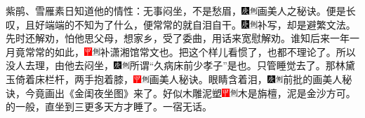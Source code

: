 紫鹃、雪雁素日知道他的情性：无事闷坐，不是愁眉，{\includegraphics[width=3mm]{../Images/00004}\includegraphics[width=3mm]{../Images/00011}\footnotesize \kaishu 画美人之秘诀。}便是长叹，且好端端的不知为了什么，便常常的就自泪自干。{\includegraphics[width=3mm]{../Images/00004}\includegraphics[width=3mm]{../Images/00011}\footnotesize \kaishu 补写，却是避繁文法。}先时还解劝，怕他思父母，想家乡，受了委曲，用话来宽慰解劝。谁知后来一年一月竟常常的如此，{\includegraphics[width=3mm]{../Images/00002}\includegraphics[width=3mm]{../Images/00011}\footnotesize \kaishu 补潇湘馆常文也。}把这个样儿看惯了，也都不理论了。所以没人去理，由他去闷坐，{\includegraphics[width=3mm]{../Images/00004}\includegraphics[width=3mm]{../Images/00011}\footnotesize \kaishu 所谓``久病床前少孝子''是也。}只管睡觉去了。那林黛玉倚着床栏杆，两手抱着膝，{\includegraphics[width=3mm]{../Images/00002}\includegraphics[width=3mm]{../Images/00011}\footnotesize \kaishu 画美人秘诀。}眼睛含着泪，{\includegraphics[width=3mm]{../Images/00004}\includegraphics[width=3mm]{../Images/00011}\footnotesize \kaishu 前批的画美人秘诀，今竟画出《金闺夜坐图》来了。}好似木雕泥塑{\includegraphics[width=3mm]{../Images/00002}\includegraphics[width=3mm]{../Images/00011}\footnotesize \kaishu 木是旃檀，泥是金沙方可。}的一般，直坐到三更多天方才睡了。一宿无话。

